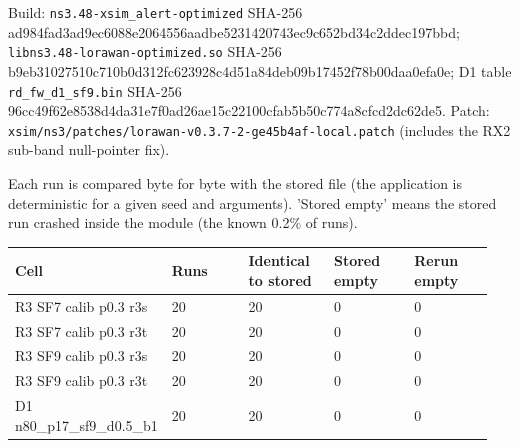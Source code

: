 


Build: \texttt{ns3.48-xsim\_alert-optimized} SHA-256 ad984fad3ad9ec6088e2064556aadbe5231420743ec9c652bd34c2ddec197bbd; \texttt{libns3.48-lorawan-optimized.so} SHA-256 b9eb31027510c710b0d312fc623928c4d51a84deb09b17452f78b00daa0efa0e; D1 table \texttt{rd\_fw\_d1\_sf9.bin} SHA-256 96cc49f62e8538d4da31e7f0ad26ae15c22100cfab5b50c774a8cfcd2dc62de5. Patch: \texttt{xsim/ns3/patches/lorawan-v0.3.7-2-ge45b4af-local.patch} (includes the RX2 sub-band null-pointer fix).

Each run is compared byte for byte with the stored file (the application is deterministic for a given seed and arguments). 'Stored empty' means the stored run crashed inside the module (the known 0.2\% of runs).

{\scriptsize\raggedright
\begin{longtable}{p{0.190\linewidth}p{0.190\linewidth}p{0.190\linewidth}p{0.190\linewidth}p{0.190\linewidth}}
\toprule
Cell & Runs & Identical to stored & Stored empty & Rerun empty \\
\midrule
\endhead
R3 SF7 calib p0.3 r3s & 20 & 20 & 0 & 0 \\
R3 SF7 calib p0.3 r3t & 20 & 20 & 0 & 0 \\
R3 SF9 calib p0.3 r3s & 20 & 20 & 0 & 0 \\
R3 SF9 calib p0.3 r3t & 20 & 20 & 0 & 0 \\
D1 n80\_p17\_sf9\_d0.5\_b1 & 20 & 20 & 0 & 0 \\
\bottomrule
\end{longtable}}

